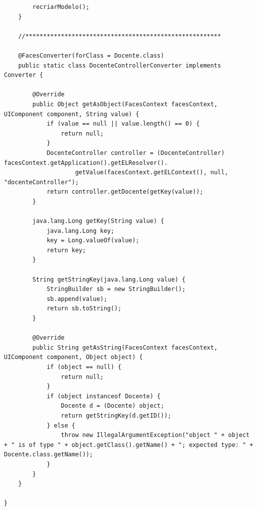 \documentclass[12pt,a4paper]{article}
\begin{document}
\begin{lstlisting}
        recriarModelo();
    }

    //*******************************************************
    
    @FacesConverter(forClass = Docente.class)
    public static class DocenteControllerConverter implements Converter {

        @Override
        public Object getAsObject(FacesContext facesContext, UIComponent component, String value) {
            if (value == null || value.length() == 0) {
                return null;
            }
            DocenteController controller = (DocenteController) facesContext.getApplication().getELResolver().
                    getValue(facesContext.getELContext(), null, "docenteController");
            return controller.getDocente(getKey(value));
        }

        java.lang.Long getKey(String value) {
            java.lang.Long key;
            key = Long.valueOf(value);
            return key;
        }

        String getStringKey(java.lang.Long value) {
            StringBuilder sb = new StringBuilder();
            sb.append(value);
            return sb.toString();
        }

        @Override
        public String getAsString(FacesContext facesContext, UIComponent component, Object object) {
            if (object == null) {
                return null;
            }
            if (object instanceof Docente) {
                Docente d = (Docente) object;
                return getStringKey(d.getID());
            } else {
                throw new IllegalArgumentException("object " + object + " is of type " + object.getClass().getName() + "; expected type: " + Docente.class.getName());
            }
        }
    }

}
\end{lstlisting}
\end{document}
